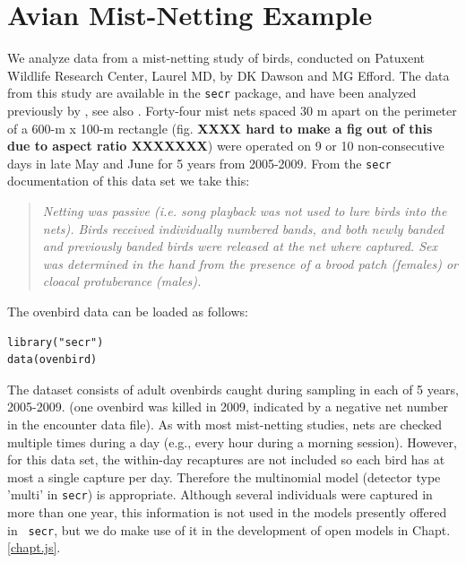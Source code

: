 \section{Avian Mist-Netting Example}

We analyze data from a mist-netting study of birds, conducted on
Patuxent Wildlife Research Center, Laurel MD, by DK Dawson and MG
Efford. The data from this study are available in the \mbox{\tt secr}
package, and have been analyzed previously by
\citet{efford_etal:2004}, see also \citet{borchers_efford:2008}.
Forty-four mist nets spaced 30 m apart on the perimeter of a 600-m x
100-m rectangle (fig. {\bf XXXX hard to make a fig out of this due to
aspect ratio XXXXXXX}) were operated on 9 or 10 non-consecutive
days in late May and June for 5 years from 2005-2009.  From the
\mbox{\tt secr} documentation of this data set we take this:
\begin{quote}
{\it
  Netting was passive (i.e. song playback was not used to lure birds
  into the nets). Birds received individually numbered bands, and both
  newly banded and previously banded birds were released at the net
  where captured. Sex was determined in the hand from the presence of
  a brood patch (females) or cloacal protuberance (males).}
\end{quote}
The ovenbird 
data can be loaded as follows:
\begin{verbatim}
library("secr")
data(ovenbird)
\end{verbatim}
The dataset consists of adult ovenbirds caught during sampling in each
of 5 years, 2005-2009. (one ovenbird was killed in 2009, indicated by
a negative net number in the encounter data file).
As with most mist-netting studies, nets are checked multiple times
during a day (e.g., every hour during a morning session). However, for
this data set, the within-day recaptures are not included so each bird
has at most a single capture per day. Therefore the multinomial model
(detector type 'multi' in \mbox{\tt secr}) is appropriate. 
 Although
several individuals were captured in more than one year, this
information is not used in the models presently offered in \mbox{\tt
  secr}, but we do make use of it in the development of open models in
Chapt. \ref{chapt.js}.
%


